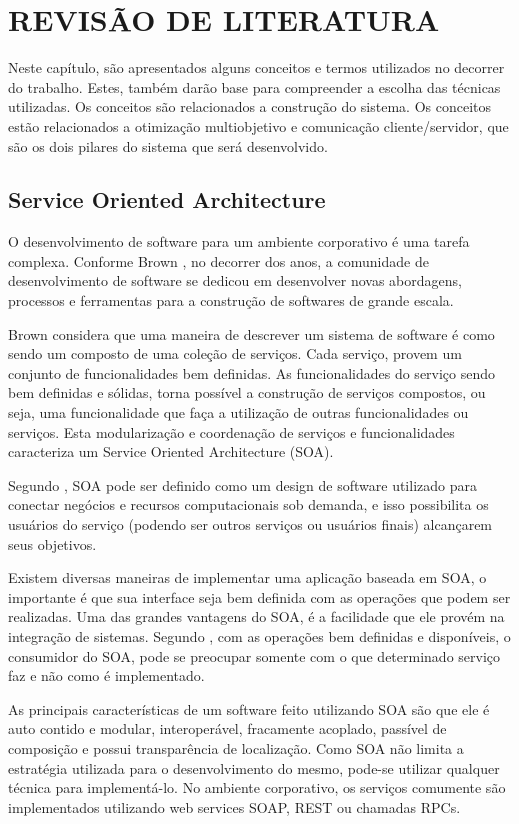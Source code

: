 \chapter{REVISÃO DE LITERATURA}
\label{chap:fundamentacaoTeorica}

Neste capítulo, são apresentados alguns conceitos e termos utilizados no decorrer do trabalho. 
Estes, também darão base para compreender a escolha das técnicas utilizadas. 
Os conceitos são relacionados a construção do sistema. 
Os conceitos estão relacionados a otimização multiobjetivo e comunicação cliente/servidor, 
que são os dois pilares do sistema que será desenvolvido.

\section{Service Oriented Architecture}
O desenvolvimento de software para um ambiente corporativo é uma tarefa complexa. 
Conforme Brown \cite{brown}, no decorrer dos anos, a comunidade de desenvolvimento de software se 
dedicou em desenvolver novas abordagens, processos e ferramentas para a construção de softwares de 
grande escala. 

Brown considera que uma maneira de descrever um sistema de software é como sendo um composto de 
uma coleção de serviços. Cada serviço, provem um conjunto de funcionalidades bem definidas. 
As funcionalidades do serviço sendo bem definidas e sólidas, torna possível a construção de serviços 
compostos, ou seja, uma funcionalidade que faça a utilização de outras funcionalidades ou serviços. 
Esta modularização e coordenação de serviços e funcionalidades caracteriza um 
Service Oriented Architecture (SOA).

Segundo \cite{valipour}, SOA pode ser definido como um design de software utilizado para 
conectar negócios e recursos computacionais sob demanda, e isso possibilita os usuários 
do serviço (podendo ser outros serviços ou usuários finais) alcançarem seus objetivos. 

Existem diversas maneiras de implementar uma aplicação baseada em SOA, o importante é que 
sua interface seja bem definida com as operações que podem ser realizadas. 
Uma das grandes vantagens do SOA, é a facilidade que ele provém na integração de sistemas. 
Segundo \cite{valipour}, com as operações bem definidas e disponíveis, o consumidor do SOA, 
pode se preocupar somente com o que determinado serviço faz e não como é implementado.

As principais características de um software feito utilizando SOA são que ele é auto contido e 
modular, interoperável, fracamente acoplado, passível de composição e possui transparência de localização. 
Como SOA não limita a estratégia utilizada para o desenvolvimento do mesmo, pode-se utilizar qualquer 
técnica para implementá-lo. No ambiente corporativo, os serviços comumente são implementados 
utilizando web services SOAP, REST ou chamadas RPCs.


